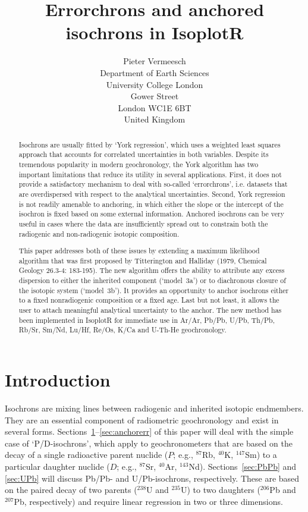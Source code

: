 \documentclass{article}
\title{Errorchrons and anchored isochrons in IsoplotR}
\author{Pieter Vermeesch\\
  Department of Earth Sciences\\
  University College London\\
  Gower Street\\
  London WC1E 6BT\\
  United Kingdom
}
\begin{document}
\maketitle

\begin{abstract}
  Isochrons are usually fitted by `York regression', which uses a
  weighted least squares approach that accounts for correlated
  uncertainties in both variables. Despite its tremendous popularity
  in modern geochronology, the York algorithm has two important
  limitations that reduce its utility in several applications. First,
  it does not provide a satisfactory mechanism to deal with so-called
  `errorchrons', i.e. datasets that are overdispersed with respect to
  the analytical uncertainties. Second, York regression is not readily
  amenable to anchoring, in which either the slope or the intercept of
  the isochron is fixed based on some external information. Anchored
  isochrons can be very useful in cases where the data are
  insufficiently spread out to constrain both the radiogenic and
  non-radiogenic isotopic composition.

  This paper addresses both of these issues by extending a maximum
  likelihood algorithm that was first proposed by Titterington and
  Halliday (1979, Chemical Geology 26.3-4: 183-195). The new algorithm
  offers the ability to attribute any excess dispersion to either the
  inherited component (`model~3a') or to diachronous closure of the
  isotopic system (`model~3b'). It provides an opportunity to anchor
  isochrons either to a fixed nonradiogenic composition or a fixed
  age. Last but not least, it allows the user to attach meaningful
  analytical uncertainty to the anchor. The new method has been
  implemented in IsoplotR for immediate use in Ar/Ar, Pb/Pb, U/Pb,
  Th/Pb, Rb/Sr, Sm/Nd, Lu/Hf, Re/Os, K/Ca and U-Th-He geochronology.
\end{abstract}

\section{Introduction}\label{sec:intro}

  Isochrons are mixing lines between radiogenic and inherited isotopic
  endmembers. They are an essential component of radiometric
  geochronology and exist in several
  forms. Sections~\ref{sec:intro}--\ref{sec:anchorerr} of this paper
  will deal with the simple case of `P/D-isochrons', which apply to
  geochronometers that are based on the decay of a single radioactive
  parent nuclide ($P$; e.g., ${}^{87}$Rb, ${}^{40}$K, ${}^{147}$Sm) to
  a particular daughter nuclide ($D$; e.g., ${}^{87}$Sr, ${}^{40}$Ar,
  ${}^{143}$Nd). Sections~\ref{sec:PbPb} and \ref{sec:UPb} will
  discuss Pb/Pb- and U/Pb-isochrons, respectively.  These are based on
  the paired decay of two parents (${}^{238}$U and ${}^{235}$U) to two
  daughters (${}^{206}$Pb and ${}^{207}$Pb, respectively) and require
  linear regression in two or three dimensions.\medskip
\end{document}
